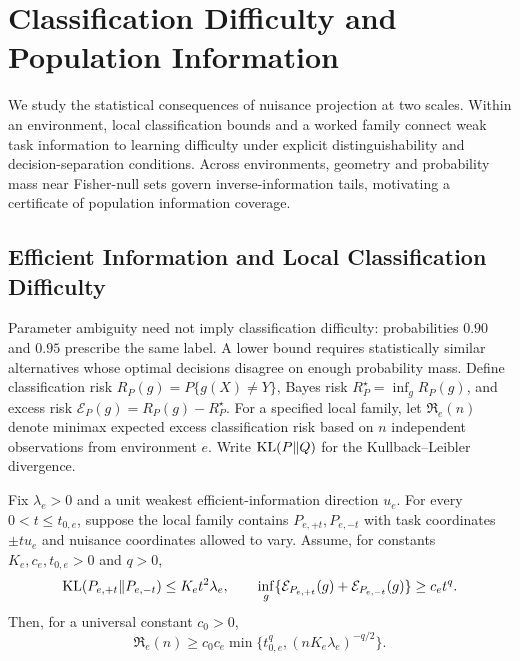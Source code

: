 \section{Classification Difficulty and Population Information}
\label{sec:tail-identifiability}

We study the statistical consequences of nuisance projection at two scales. Within an environment, local classification bounds and a worked family connect weak task information to learning difficulty under explicit distinguishability and decision-separation conditions. Across environments, geometry and probability mass near Fisher-null sets govern inverse-information tails, motivating a certificate of population information coverage.

\subsection{Efficient Information and Local Classification Difficulty}
\label{sec:classification-difficulty}

Parameter ambiguity need not imply classification difficulty: probabilities $0.90$ and $0.95$ prescribe the same label. A lower bound requires statistically similar alternatives whose optimal decisions disagree on enough probability mass. Define classification risk $R_P(g)=P\{g(X)\ne Y\}$, Bayes risk $R_P^\star=\inf_g R_P(g)$, and excess risk $\mathcal E_P(g)=R_P(g)-R_P^\star$. For a specified local family, let $\mathfrak R_e(n)$ denote minimax expected excess classification risk based on $n$ independent observations from environment $e$. Write $\operatorname{KL}(P\Vert Q)$ for the Kullback--Leibler divergence.

\begin{theorem}
\label{thm:local-classification-difficulty}
Fix $\lambda_e>0$ and a unit weakest efficient-information direction $u_e$. For every $0<t\le t_{0,e}$, suppose the local family contains $P_{e,+t},P_{e,-t}$ with task coordinates $\pm tu_e$ and nuisance coordinates allowed to vary. Assume, for constants $K_e,c_e,t_{0,e}>0$ and $q>0$,
\begin{equation}
\operatorname{KL}(P_{e,+t}\Vert P_{e,-t})\le K_et^2\lambda_e,
\qquad
\inf_g\{\mathcal E_{P_{e,+t}}(g)+\mathcal E_{P_{e,-t}}(g)\}\ge c_et^q.
\label{eq:local-classification-assumptions}
\end{equation}
Then, for a universal constant $c_0>0$,
\begin{equation}
\mathfrak R_e(n)\ge c_0c_e
\min\{t_{0,e}^q,(nK_e\lambda_e)^{-q/2}\}.
\label{eq:local-classification-lower-bound}
\end{equation}
\end{theorem}

